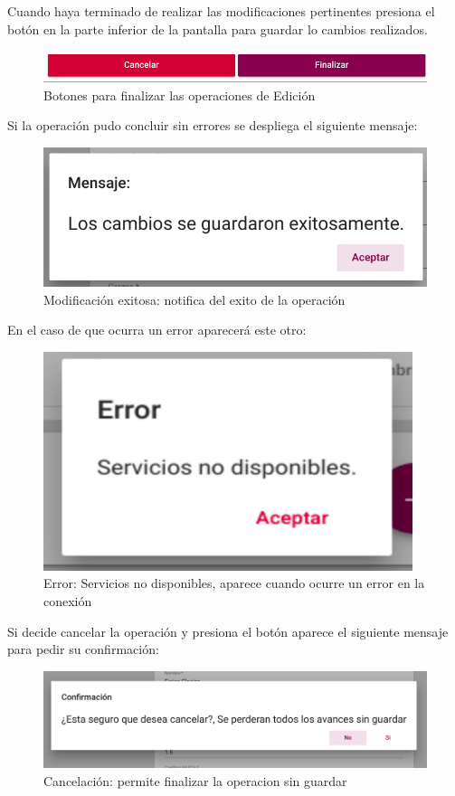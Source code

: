 Cuando haya terminado de realizar las modificaciones pertinentes presiona el botón  en la parte inferior de la pantalla para guardar lo cambios realizados.\\
\begin{figure}[H]
    \centering
    \hypertarget{finalizarBtnE}{\includegraphics[width=0.7\linewidth]{images/GUA/finalizarBtn}}
    \caption{Botones para finalizar las operaciones de Edición}
    \label{finalizarBtnE}
\end{figure}
Si la operación pudo concluir sin errores se despliega el siguiente mensaje:\\
\begin{figure}[H]
    \centering
    \hypertarget{modificacion}{\includegraphics[width=0.7\linewidth]{images/GUA/modificacion}}
    \caption{Modificación exitosa: notifica del exito de la operación}
    \label{modificacion}
\end{figure}
En el caso de que ocurra un error aparecerá este otro:\\
\begin{figure}[H]
    \centering
    \hypertarget{errorE}{\includegraphics[width=0.7\linewidth]{images/GUA/error}}
    \caption{Error: Servicios no disponibles, aparece cuando ocurre un error en la conexión}
    \label{errorE}
\end{figure}
Si decide cancelar la operación y presiona el botón  aparece el siguiente mensaje para pedir su confirmación:\\
\begin{figure}[H]
    \centering
    \hypertarget{cancelarE}{\includegraphics[width=0.7\linewidth]{images/GUA/cancelar}}
    \caption{Cancelación: permite finalizar la operacion sin guardar}
    \label{cancelarE}
\end{figure}
\newpage
